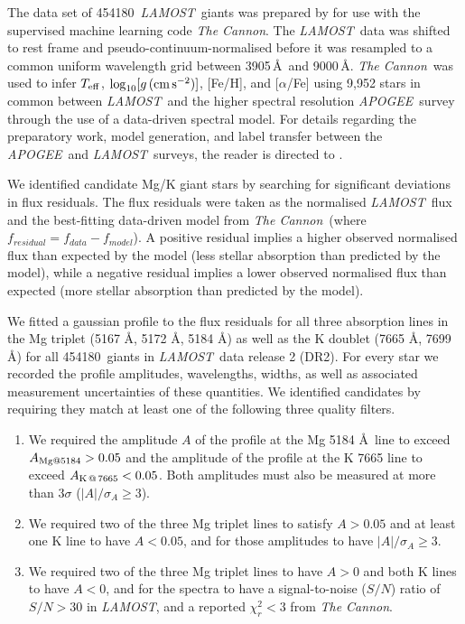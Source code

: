 \documentclass[a4paper,fleqn,usenatbib]{mnras}
\newcommand{\LamostGiants}{454180}
\newcommand{\project}[1]{\emph{#1}}
\newcommand{\lamost}{\project{LAMOST}}
\newcommand{\apogee}{\project{APOGEE}}
\newcommand{\tc}{\project{The Cannon}}
\newcommand{\teff}{T_{\rm eff}}
\newcommand{\logg}{\log_{10}[g\,({\rm cm\,s}^{-2})]}
\begin{document}
The data set of \LamostGiants\ \lamost\ giants was prepared by \citet{ho2017} for use with the supervised machine learning code \tc. The \lamost\ data was shifted to rest frame and pseudo-continuum-normalised before it was resampled to a common uniform wavelength grid between 3905\,\AA\ and 9000\,\AA. \tc\ was used to infer $\teff$, $\logg$, [Fe/H], and [$\alpha$/Fe] using 9,952 stars in common between \lamost\ and the higher spectral resolution \apogee\ survey through the use of a data-driven spectral model. For details regarding the preparatory work, model generation, and label transfer between the \apogee\ and \lamost\ surveys, the reader is directed to \citet{ho2017}. 

We identified candidate Mg/K giant stars by searching for significant deviations in flux residuals. The flux residuals were taken as the normalised \lamost\ flux and the best-fitting data-driven model from \tc\ (where $f_{residual} = f_{data} - f_{model}$). A positive residual implies a higher observed normalised flux than expected by the model (less stellar absorption than predicted by the model), while a negative residual implies a lower observed normalised flux than expected (more stellar absorption than predicted by the model). 

We fitted a gaussian profile to the flux residuals for all three absorption lines in the Mg triplet (5167 \AA, 5172 \AA, 5184 \AA) as well as the K doublet (7665 \AA, 7699 \AA) for all \LamostGiants\ giants in \lamost\ data release 2 (DR2). For every star we recorded the profile amplitudes, wavelengths, widths, as well as associated measurement uncertainties of these quantities. We identified candidates by requiring they match at least one of the following three quality filters.
\begin{enumerate}
\item We required the amplitude $A$ of the profile at the Mg 5184 \AA \ line to exceed $A_{{\rm Mg} @ 5184} > 0.05$ and the amplitude of the profile at the K 7665 line to exceed $A_{{\rm K}\,@\,7665} < 0.05$. Both amplitudes must also be measured at more than $3\sigma$ ($|A|/\sigma_{A} \geq 3$).
\item We required two of the three Mg triplet lines to satisfy $A > 0.05$ and at least one K line to have $A < 0.05$, and for those amplitudes to have $|A|/\sigma_{A} \geq 3$.
\item We required two of the three Mg triplet lines to have $A > 0$ and both K lines to have $A < 0$, and for the spectra to have a signal-to-noise ($S/N$) ratio of $S/N > 30$ in \lamost, and a reported $\chi_{r}^2 < 3$ from \tc.
\end{enumerate} 
 
\end{document}
